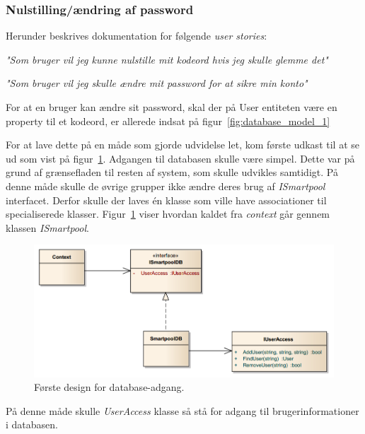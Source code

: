 \subsubsection{Nulstilling/ændring af password}
Herunder beskrives dokumentation for følgende \textit{user stories}:

\textit{"Som bruger vil jeg kunne nulstille mit kodeord hvis jeg skulle glemme det"}

\textit{"Som bruger vil jeg skulle ændre mit password for at sikre min konto"}

For at en bruger kan ændre sit password, skal der på User entiteten være en property til et kodeord, er allerede indsat på figur~\ref{fig:database_model_1}















For at lave dette på en måde som gjorde udvidelse let, kom første udkast til at se ud som vist på figur~\ref{fig:database_class_1}. Adgangen til databasen skulle være simpel. Dette var på grund af grænsefladen til resten af system, som skulle udvikles samtidigt. På denne måde skulle de øvrige grupper ikke ændre deres brug af \textit{ISmartpool} interfacet.  Derfor skulle der laves én klasse som ville have associationer til specialiserede klasser. Figur~\ref{fig:database_class_1} viser hvordan kaldet fra \textit{context} går gennem klassen \textit{ISmartpool}.

\begin{figure}[h]
	\centering
	\includegraphics[width=0.9\linewidth]{figs/design/database_class_1}
	\caption{Første design for database-adgang.}
	\label{fig:database_class_1}
\end{figure}

På denne måde skulle \textit{UserAccess} klasse så stå for adgang til brugerinformationer i databasen. 

